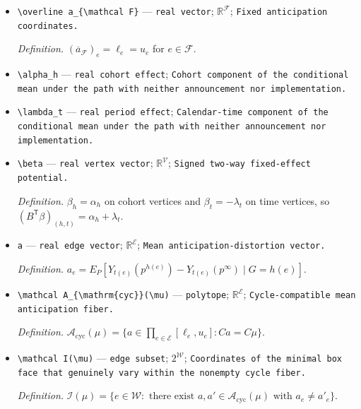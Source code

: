 \documentclass{article}
\begin{document}
\begin{itemize}
  \item \texttt{\textbackslash{}\allowbreak{}overline a\_\allowbreak{}\{\textbackslash{}\allowbreak{}mathcal F\}\allowbreak{}} --- \texttt{real vector}; \(\mathbb R^{\mathcal F}\); \texttt{Fixed anticipation coordinates.}
  \par\smallskip\noindent\emph{Definition.} \((\overline a_{\mathcal F})_e=\ell_e=u_e\) for \(e\in\mathcal F\).
  \item \texttt{\textbackslash{}\allowbreak{}alpha\_\allowbreak{}h} --- \texttt{real cohort effect}; \texttt{Cohort component of the conditional mean under the path with neither announcement nor implementation.}
  \item \texttt{\textbackslash{}\allowbreak{}lambda\_\allowbreak{}t} --- \texttt{real period effect}; \texttt{Calendar-\allowbreak{}time component of the conditional mean under the path with neither announcement nor implementation.}
  \item \texttt{\textbackslash{}\allowbreak{}beta} --- \texttt{real vertex vector}; \(\mathbb R^{\mathcal V}\); \texttt{Signed two-\allowbreak{}way fixed-\allowbreak{}effect potential.}
  \par\smallskip\noindent\emph{Definition.} \(\beta_h=\alpha_h\) on cohort vertices and \(\beta_t=-\lambda_t\) on time vertices, so \((B^{\mathsf T}\beta)_{(h,t)}=\alpha_h+\lambda_t\).
  \item \texttt{a} --- \texttt{real edge vector}; \(\mathbb R^{\mathcal E}\); \texttt{Mean anticipation-\allowbreak{}distortion vector.}
  \par\smallskip\noindent\emph{Definition.} \(a_e=E_P[Y_{t(e)}(p^{h(e)})-Y_{t(e)}(p^\infty)\mid G=h(e)]\).
  \item \texttt{\textbackslash{}\allowbreak{}mathcal A\_\allowbreak{}\{\textbackslash{}\allowbreak{}mathrm\{cyc\}\allowbreak{}\}\allowbreak{}(\textbackslash{}\allowbreak{}mu)} --- \texttt{polytope}; \(\mathbb R^{\mathcal E}\); \texttt{Cycle-\allowbreak{}compatible mean anticipation fiber.}
  \par\smallskip\noindent\emph{Definition.} \(\mathcal A_{\mathrm{cyc}}(\mu)=\{a\in\prod_{e\in\mathcal E}[\ell_e,u_e]:Ca=C\mu\}\).
  \item \texttt{\textbackslash{}\allowbreak{}mathcal I(\textbackslash{}\allowbreak{}mu)} --- \texttt{edge subset}; \(2^{\mathcal W}\); \texttt{Coordinates of the minimal box face that genuinely vary within the nonempty cycle fiber.}
  \par\smallskip\noindent\emph{Definition.} \(\mathcal I(\mu)=\{e\in\mathcal W:\text{ there exist }a,a'\in\mathcal A_{\mathrm{cyc}}(\mu)\text{ with }a_e\ne a'_e\}\).

\end{itemize}
\end{document}
